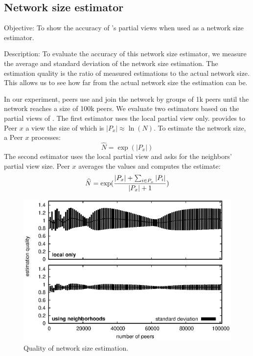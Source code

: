 \subsection{Network size estimator}

\begin{asparadesc}
\item [Objective:] To show the accuracy of \SPRAY's partial views when used as a
  network size estimator.
\item [Description:] To evaluate the accuracy of this network size estimator, we
  measure the average and standard deviation of the network size estimation. The
  estimation quality is the ratio of measured estimations to the actual network
  size. This allows us to see how far from the actual network size the
  estimation can be. 

  In our experiment, peers use \SPRAY and join the network by groups of 1k peers
  until the network reaches a size of 100k peers. We evaluate two estimators
  based on the partial views of \SPRAY. The first estimator uses the local
  partial view only.  \SPRAY provides to Peer $x$ a view the size of which is
  $|P_x| \approx \ln(N)$. To estimate the network size, a Peer $x$ processes:
  \begin{equation*}
    \widehat{N}= \exp{(|P_x|)}
  \end{equation*}
  The second estimator uses the local partial view and asks for the neighbors'
  partial view size. Peer $x$ averages the values and computes the estimate:
  \begin{equation*}
    \widehat{N} = \exp({ {|P_x| + \sum_{i \in P_x} {|P_i|}} \over{|P_x|+1} })
  \end{equation*}

\begin{figure}
  \centering
  \includegraphics[width=\SCALE\textwidth]{img/estimator.eps}
  \caption{\label{fig:estimator}Quality of network size estimation.}
\end{figure}


\end{asparadesc}
